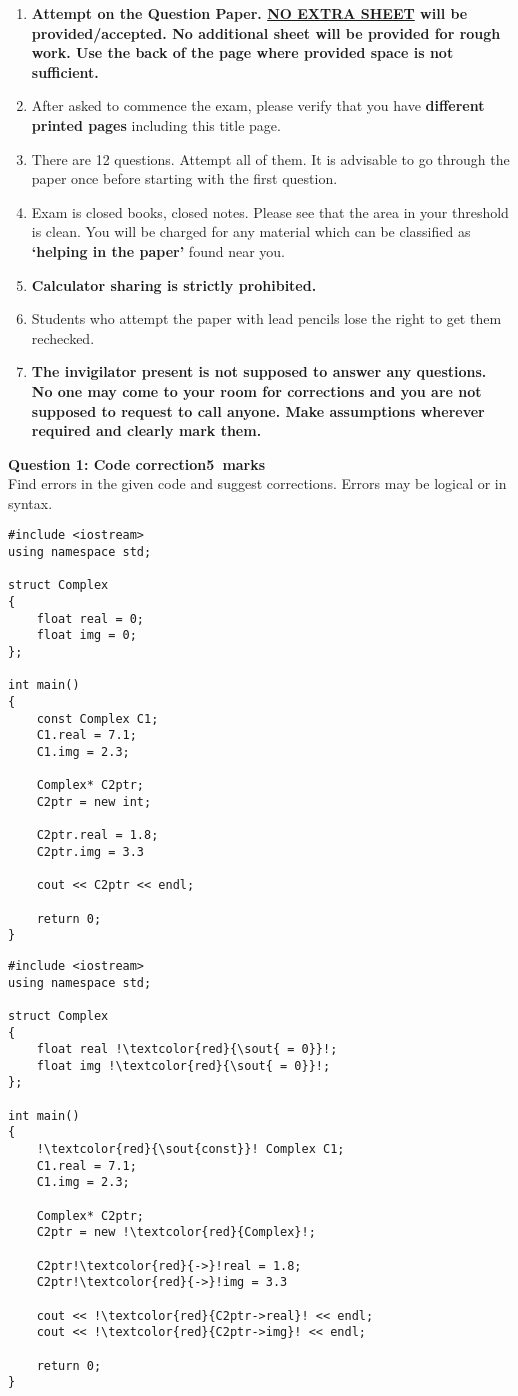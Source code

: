\documentclass[12pt,a4paper]{article}
\def\QOne{5}
\begin{document}
\begin{enumerate}
\item \textbf{Attempt on the Question Paper. \underline{NO EXTRA SHEET} will be provided/accepted. No
additional sheet will be provided for rough work. Use the back of the page where
provided space is not sufficient.}
\item After asked to commence the exam, please verify that you have \textbf{\pageref{LastPage} different
printed pages} including this title page.
\item There are 12 questions. Attempt all of them. It is advisable to go through the paper once
before starting with the first question.
\item Exam is closed books, closed notes. Please see that the area in your threshold is clean.
You will be charged for any material which can be classified as \textbf{`helping in the paper'}
found near you.
\item \textbf{Calculator sharing is strictly prohibited.}
\item Students who attempt the paper with lead pencils lose the right to get them rechecked.
\item \textbf{The invigilator present is not supposed to answer any questions. No one may come
to your room for corrections and you are not supposed to request to call anyone.
Make assumptions wherever required and clearly mark them.}
\end{enumerate}
\newpage
\noindent\textbf{Question 1: Code correction\hfill \QOne~marks}\\
Find errors in the given code and suggest corrections. Errors may be logical or in syntax.
\begin{lstlisting}
#include <iostream>
using namespace std;

struct Complex
{
	float real = 0;
	float img = 0;
};

int main()
{
	const Complex C1;
	C1.real = 7.1;
	C1.img = 2.3;

	Complex* C2ptr;
	C2ptr = new int;
	
	C2ptr.real = 1.8;
	C2ptr.img = 3.3
	
	cout << C2ptr << endl;

	return 0;
}
\end{lstlisting}
\begin{lstlisting}[escapechar=!]
#include <iostream>
using namespace std;

struct Complex
{
	float real !\textcolor{red}{\sout{ = 0}}!;
	float img !\textcolor{red}{\sout{ = 0}}!;
};

int main()
{
	!\textcolor{red}{\sout{const}}! Complex C1;
	C1.real = 7.1;
	C1.img = 2.3;

	Complex* C2ptr;
	C2ptr = new !\textcolor{red}{Complex}!;
	
	C2ptr!\textcolor{red}{->}!real = 1.8;
	C2ptr!\textcolor{red}{->}!img = 3.3
	
	cout << !\textcolor{red}{C2ptr->real}! << endl;
	cout << !\textcolor{red}{C2ptr->img}! << endl;

	return 0;
}
\end{lstlisting}
\end{document}
